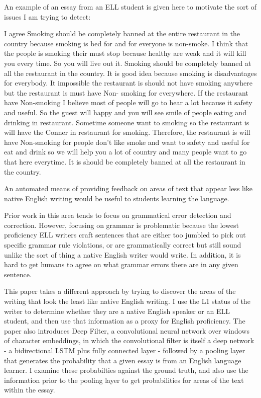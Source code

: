\documentclass{article} %
\begin{document}
An example of an essay from an ELL student is given here to motivate the sort
of issues I am trying to detect:

\begin{displayquote}
I agree Smoking should be completely banned at the entire restaurant in the
country because smoking is bed for and for everyone is non-smoke. I think that
the people is smoking their must stop because healthy are weak and it will kill
you every time. So you will live out it. Smoking should be completely banned at
all the restaurant in the country. It is good idea because smoking is
disadvantages for everybody. It impossible the restaurant is should not have
smoking anywhere but the restaurant is must have Non- smoking for everywhere.
If the restaurant have Non-smoking I believe most of people will go to hear a
lot because it safety and useful. So the guest will happy and you will see
smile of people eating and drinking in restaurant. Sometime someone want to
smoking so the restaurant is will have the Conner in restaurant for smoking.
Therefore, the restaurant is will have Non-smoking for people don't like smoke
and want to safety and useful for eat and drink so we will help you a lot of
country and many people want to go that here everytime. It is should be
completely banned at all the restaurant in the country.

\end{displayquote}

An automated means of providing feedback on areas of text that appear less
like native English writing would be useful to students learning the language.

Prior work in this area tends to focus on grammatical error detection and correction.
However, focusing on grammar is problematic because the lowest proficiency ELL
writers craft sentences that are either too
jumbled to pick out specific grammar rule violations, or are grammatically correct
but still sound unlike the sort of thing a native English writer would write. In
addition, it is hard to get humans to agree on what grammar errors there are in
any given sentence.\cite{bryant}

This paper takes a different approach by trying to discover the areas of the
writing that look the least like native English writing. I use the L1 status of
the writer to determine whether they are a native English speaker or an ELL student,
and then use that information as a proxy for English proficiency. The paper also
introduces Deep Filter, a convolutional neural network over windows of
character embeddings,
in which the convolutional filter is itself a deep network - a bidirectional
LSTM plus fully connected layer - followed by a pooling layer that generates
the probability that a given essay is from an English language learner. I examine
these probabilties against the ground truth, and also use the information prior
to the pooling layer to get probabilities for areas of the text within the essay.
\end{document}
